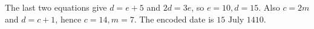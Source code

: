 The last two equations give $d=e+5$ and $2d=3e$, so $e=10,d=15$. Also $c=2m$ and $d=c+1$, hence $c=14,m=7$. The encoded date is $\boxed{15\text{ July }1410}$.
